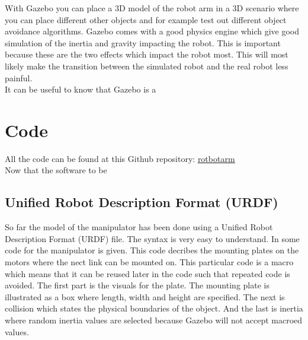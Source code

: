 With Gazebo you can place a 3D model of the robot arm in a 3D scenario where you can place different other objects and for example test out different object avoidance algorithms. Gazebo comes with a good physics engine which give good simulation of the inertia and gravity impacting the robot. This is important because these are the two effects which impact the robot most. This will most likely make the transition between the simulated robot and the real robot less painful. \\

It can be useful to know that Gazebo is a 









\section{Code}
All the code can be found at this Github repository: \href{https://github.com/Aarskog/robotarm}{\underline{rotbotarm}}\\

Now that the software to be

\subsection{Unified Robot Description Format (URDF)}
So far the model of the manipulator has been done using a Unified Robot Description Format (URDF) file. The syntax is very easy to understand. In  some code for the manipulator is given. This code decribes the mounting plates on the motors where the nect link can be mounted on. 
This particular code is a macro which means that it can be reused later in the code such that repeated code is avoided. The first part is the visuals for the plate. The mounting plate is illustrated as a box where length, width and height are specified. The next is collision which states the physical boundaries of the object. And the last is inertia where random inertia values are selected because Gazebo will not accept macroed values.


